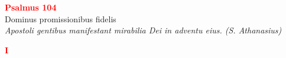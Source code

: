 


\def\greinitialformat#1{%
{\fontsize{39}{39}\selectfont #1}%
}




\vspace{0.3cm}
\begin{center}
 \textcolor{red}{\large \bf Psalmus 104}\\
Dominus promissionibus fidelis\\
\textit{\small Apostoli gentibus manifestant mirabilia Dei in adventu eius. (S. Athanasius)}
\end{center}
\begin{center}
\textcolor{red}{\bf I}
\end{center}
